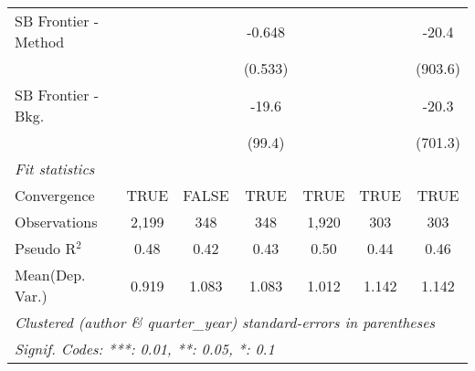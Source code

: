 \begin{tabular}{lcccccc}
   SB Frontier - Method         &               &              & -0.648       &               &              & -20.4\\   
                                &               &              & (0.533)      &               &              & (903.6)\\   
   SB Frontier - Bkg.           &               &              & -19.6        &               &              & -20.3\\   
                                &               &              & (99.4)       &               &              & (701.3)\\   
   \midrule
   \emph{Fit statistics}\\
   Convergence                  &TRUE           & FALSE        & TRUE         & TRUE          & TRUE         & TRUE\\  
   Observations                 & 2,199         & 348          & 348          & 1,920         & 303          & 303\\  
   Pseudo R$^2$                 & 0.48          & 0.42         & 0.43         & 0.50          & 0.44         & 0.46\\  
Mean(Dep. Var.) & 0.919 & 1.083 & 1.083 & 1.012 & 1.142 & 1.142 \\
   \midrule \midrule
   \multicolumn{7}{l}{\emph{Clustered (author \& quarter\_year) standard-errors in parentheses}}\\
   \multicolumn{7}{l}{\emph{Signif. Codes: ***: 0.01, **: 0.05, *: 0.1}}\\
\end{tabular}
\par\endgroup
